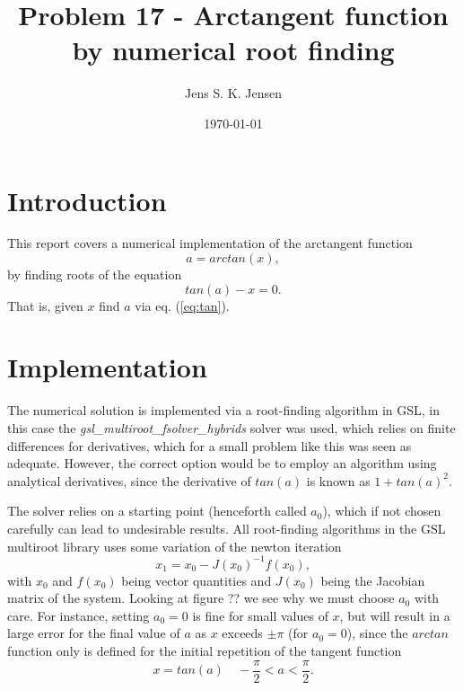 \documentclass{article}
\begin{document}
\title{Problem 17 - Arctangent function by numerical root finding}
\author{Jens S. K. Jensen}
\date{\today}
\maketitle

\section{Introduction}
This report covers a numerical implementation of the arctangent function
\begin{equation}
	a = arctan(x),
	\label{eq:atan1}
\end{equation}
by finding roots of the equation
\begin{equation}
	tan(a) - x = 0.
	\label{eq:tan}
\end{equation}
That is, given $x$ find $a$ via eq. (\ref{eq:tan}).

\section{Implementation}
The numerical solution is implemented via a root-finding algorithm in GSL, in this case the \textit{gsl\_multiroot\_fsolver\_hybrids} solver was used, which relies on finite differences for derivatives, which for a small problem like this was seen as adequate. However, the correct option would be to employ an algorithm using analytical derivatives, since the derivative of $tan(a)$ is known as $1+tan(a)^2$.

The solver relies on a starting point (henceforth called $a_0$), which if not chosen carefully can lead to undesirable results. All root-finding algorithms in the GSL multiroot library uses some variation of the newton iteration
\begin{equation}
	x_1 = x_0 - J(x_0)^{-1}f(x_0),
\end{equation}
with $x_0$ and $f(x_0)$ being vector quantities and $J(x_0)$ being the Jacobian matrix of the system. Looking at figure ?? we see why we must choose $a_0$ with care. For instance, setting $a_0 = 0$ is fine for small values of $x$, but will result in a large error for the final value of $a$ as $x$ exceeds $\pm \pi$ (for $a_0=0$), since the $arctan$ function only is defined for the initial repetition of the tangent function
\begin{equation}
	x = tan(a) \quad -\frac{\pi}{2}<a<\frac{\pi}{2}.
\end{equation}
\end{document}
